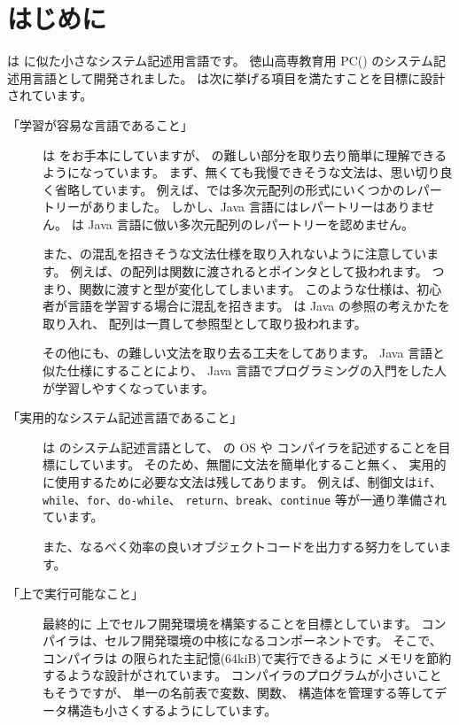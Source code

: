 % 
%
\chapter{はじめに}

\cmml は \cl に似た小さなシステム記述用言語です。
徳山高専教育用 PC(\tac) のシステム記述用言語として開発されました。
\cmml は次に挙げる項目を満たすことを目標に設計されています。

\begin{description}
\item[「学習が容易な言語であること」]
\cmml は \cl をお手本にしていますが、
\cl の難しい部分を取り去り簡単に理解できるようになっています。
まず、無くても我慢できそうな文法は、思い切り良く省略しています。
例えば、\cl では多次元配列の形式にいくつかのレパートリーがありました。
しかし、Java 言語にはレパートリーはありません。
\cmml は Java 言語に倣い多次元配列のレパートリーを認めません。

また、\cl の混乱を招きそうな文法仕様を取り入れないように注意しています。
例えば、\cl の配列は関数に渡されるとポインタとして扱われます。
つまり、関数に渡すと型が変化してしまいます。
このような仕様は、初心者が言語を学習する場合に混乱を招きます。
\cmml は Java の参照の考えかたを取り入れ、
配列は一貫して参照型として取り扱われます。

その他にも、\cl の難しい文法を取り去る工夫をしてあります。
Java 言語と似た仕様にすることにより、
Java 言語でプログラミングの入門をした人が学習しやすくなっています。

\item[「実用的なシステム記述言語であること」]
\cmml は \tac のシステム記述言語として、
\tac の OS や \cmm コンパイラを記述することを目標にしています。
そのため、無闇に文法を簡単化すること無く、
実用的に使用するために必要な文法は残してあります。
例えば、制御文は{\tt if}、{\tt while}、{\tt for}、{\tt do-while}、
{\tt return}、{\tt break}、{\tt continue} 等が一通り準備されています。

また、なるべく効率の良いオブジェクトコードを出力する努力をしています。

\item[「\tac 上で実行可能なこと」]
最終的に \tac 上でセルフ開発環境を構築することを目標としています。
\cmm コンパイラは、セルフ開発環境の中核になるコンポーネントです。
そこで、\cmm コンパイラは \tac の限られた主記憶(64kiB)で実行できるように
メモリを節約するような設計がされています。
コンパイラのプログラムが小さいこともそうですが、
単一の名前表で変数、関数、
構造体を管理する等してデータ構造も小さくするようにしています。


\end{description}
